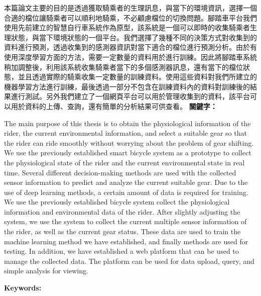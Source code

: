 \begin{abstractzh}
本篇論文主要的目的是透過獲取騎乘者的生理訊息，與當下的環境資訊，選擇一個合適的檔位讓騎乘者可以順利地騎乘，不必顧慮檔位的切換問題。腳踏車平台我們使用先前建立的智慧自行車系統作為原型，該系統是一個可以即時的收集騎乘者生理狀態，與當下環境狀態的一個平台。我們選擇了幾種不同的決策方式對收集到的資料進行預測，透過收集到的感測器資訊對當下適合的檔位進行預測分析。由於有使用深度學習方面的方法，需要一定數量的資料用於進行訓練。因此將腳踏車系統稍加調整後，利用該系統收集騎乘者當下的多個感測器訊息，還有當下的檔位狀態，並且透過實際的騎乘收集一定數量的訓練資料。使用這些資料對我們所建立的機器學習方法進行訓練，最後透過一部分不包含在訓練資料內的資料對訓練後的結果進行測試。另外我們建立了一個網頁平台可以用於管理收集到的資料，該平台可以用於資料的上傳、查詢，還有簡單的分析結果可供查看。
\bigbreak
\noindent \textbf{關鍵字：}{\, \makeatletter \@keywordszh \makeatother}
\end{abstractzh}

\begin{abstracten}
The main purpose of this thesis is to obtain the physiological information of the rider, the current environmental information, and select a suitable gear so that the rider can ride smoothly without worrying about the problem of gear shifting. We use the previously established smart bicycle system as a prototype to collect the physiological state of the rider and the current environmental state in real time. 
Several different decision-making methods are used with the collected sensor information to predict and analyze the current suitable gear. Due to the use of deep learning methods, a certain amount of data is required for training. We use the previously established bicycle system collect the physiological information and environmental data of the rider. After slightly adjusting the system, we use the system to collect the current multiple sensor information of the rider, as well as the current gear status. 
These data are used to train the machine learning method we have established, and finally methods are used for testing. In addition, we have established a web platform that can be used to manage the collected data. The platform can be used for data upload, query, and simple analysis for viewing.


\bigbreak
\noindent \textbf{Keywords:}{\, \makeatletter \@keywordsen \makeatother}
\end{abstracten}

